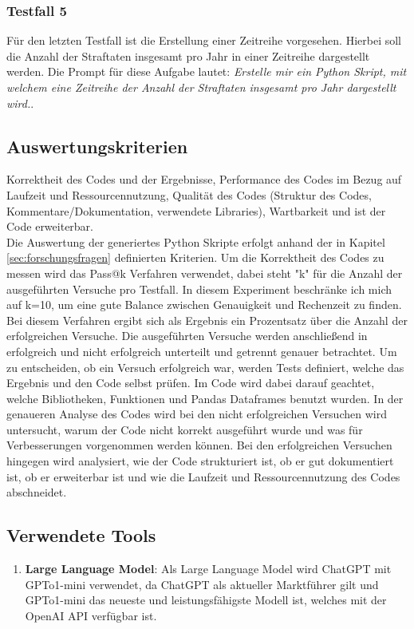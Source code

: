 \documentclass[11pt,a4paper]{article}
\begin{document}
\subsubsection{Testfall 5}
    Für den letzten Testfall ist die Erstellung einer Zeitreihe vorgesehen. Hierbei soll die Anzahl der Straftaten insgesamt pro Jahr in einer Zeitreihe dargestellt werden. Die Prompt für diese Aufgabe lautet: \emph{Erstelle mir ein Python Skript, mit welchem eine Zeitreihe der Anzahl der Straftaten insgesamt pro Jahr dargestellt wird.}.


\subsection{Auswertungskriterien}
\label{sec:auswertungskriterien}
    Korrektheit des Codes und der Ergebnisse, Performance des Codes im Bezug auf Laufzeit und Ressourcennutzung, Qualität des Codes (Struktur des Codes, Kommentare/Dokumentation, verwendete Libraries), Wartbarkeit und ist der Code erweiterbar.\\

    Die Auswertung der generiertes Python Skripte erfolgt anhand der in Kapitel \ref{sec:forschungsfragen} definierten Kriterien. Um die Korrektheit des Codes zu messen wird das Pass@k Verfahren verwendet, dabei steht "k" für die Anzahl der ausgeführten Versuche pro Testfall. In diesem Experiment beschränke ich mich auf k=10, um eine gute Balance zwischen Genauigkeit und Rechenzeit zu finden. Bei diesem Verfahren ergibt sich als Ergebnis ein Prozentsatz über die Anzahl der erfolgreichen Versuche. Die ausgeführten Versuche werden anschließend in erfolgreich und nicht erfolgreich unterteilt und getrennt genauer betrachtet. Um zu entscheiden, ob ein Versuch erfolgreich war, werden Tests definiert, welche das Ergebnis und den Code selbst prüfen. Im Code wird dabei darauf geachtet, welche Bibliotheken, Funktionen und Pandas Dataframes benutzt wurden.
    In der genaueren Analyse des Codes wird bei den nicht erfolgreichen Versuchen wird untersucht, warum der Code nicht korrekt ausgeführt wurde und was für Verbesserungen vorgenommen werden können. Bei den erfolgreichen Versuchen hingegen wird analysiert, wie der Code strukturiert ist, ob er gut dokumentiert ist, ob er erweiterbar ist und wie die Laufzeit und Ressourcennutzung des Codes abschneidet.

\subsection{Verwendete Tools}
    \begin{enumerate}
        \item \textbf{Large Language Model}: Als Large Language Model wird ChatGPT mit GPTo1-mini verwendet, da ChatGPT als aktueller Marktführer gilt und GPTo1-mini das neueste und leistungsfähigste Modell ist, welches mit der OpenAI API verfügbar ist.
        
    \end{enumerate}
\end{document}
